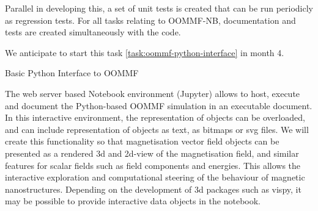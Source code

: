 \begin{workpackage}[id=UI,wphases=24-48,
  title=User Interfaces,
  PSRM=1,
  JURM=12, %
  LLRM=1, %
  SARM=1, %
  UKRM=1, %
  UBRM=1, %
  USORM=25]
\begin{tasklist}
\begin{task}[id=oommf-python-interface,title=OOMMF case study: Create Python interface to OOMMF code]
  Parallel in developing this, a set of unit tests is created that can
  be run periodicly as regression tests. For all tasks relating to
  OOMMF-NB, documentation and tests are created simultaneously with
  the code.

  We anticipate to start this task \ref{task:oommf-python-interface}
  in month 4.
\end{task}
\end{tasklist}

\begin{wpdelivs}
  \begin{wpdeliv}[due=9,id=del:oommf-py-raw,dissem=??,nature=??]
      {Basic Python Interface to OOMMF}
\end{wpdeliv}
\end{wpdelivs}

\begin{tasklist}
\begin{task}[title=OOMMF case study: Extend \texttt{OOMMF-py} with IPython
    notebook attributes and GUI templates]

  The web server based Notebook environment (Jupyter) allows to host,
  execute and document the Python-based OOMMF simulation in an
  executable document. In this interactive environment, the
  representation of objects can be overloaded, and can include
  representation of objects as text, as bitmaps or svg files. We will
  create this functionality so that magnetisation vector field objects
  can be presented as a rendered 3d and 2d-view of the magnetisation
  field, and similar features for scalar fields such as field
  components and energies. This allows the interactive exploration and
  computational steering of the behaviour of magnetic
  nanostructures. Depending on the development of 3d packages such as
  vispy, it may be possible to provide interactive data objects in the
  notebook.


\end{task}
\end{tasklist}
\end{workpackage}
